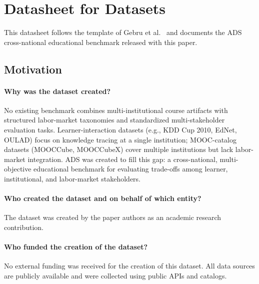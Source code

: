 
\section{Datasheet for Datasets}
\label{sec:datasheet}

This datasheet follows the template of Gebru et al.~\cite{gebru2021datasheets}
and documents the ADS cross-national educational benchmark released with this paper.

\subsection{Motivation}

\paragraph{Why was the dataset created?}
No existing benchmark combines multi-institutional course artifacts with structured labor-market taxonomies and standardized multi-stakeholder evaluation tasks.
Learner-interaction datasets (e.g., KDD Cup 2010, EdNet, OULAD) focus on knowledge tracing at a single institution; MOOC-catalog datasets (MOOCCube, MOOCCubeX) cover multiple institutions but lack labor-market integration.
ADS was created to fill this gap: a cross-national, multi-objective educational benchmark for evaluating trade-offs among learner, institutional, and labor-market stakeholders.

\paragraph{Who created the dataset and on behalf of which entity?}
The dataset was created by the paper authors as an academic research contribution.

\paragraph{Who funded the creation of the dataset?}
No external funding was received for the creation of this dataset.
All data sources are publicly available and were collected using public APIs and catalogs.

